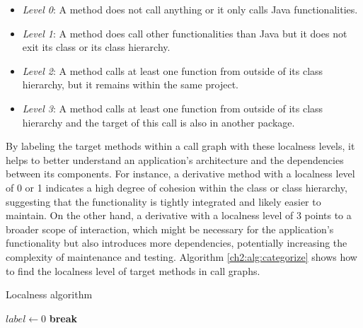 \begin{itemize}
    \item \emph{Level 0}: A method does not call anything or it only calls Java functionalities.
    \item \emph{Level 1}: A method does call other functionalities than Java but it does not exit its class or its class hierarchy.
    \item \emph{Level 2}: A method calls at least one function from outside of its class hierarchy, but it remains within the same project.
    \item \emph{Level 3}: A method calls at least one function from outside of its class hierarchy and the target of this call is also in another package.
\end{itemize}

By labeling the target methods within a call graph with these localness levels, it helps to better understand an application's architecture and the dependencies between its components. For instance, a derivative method with a localness level of 0 or 1 indicates a high degree of cohesion within the class or class hierarchy, suggesting that the functionality is tightly integrated and likely easier to maintain. On the other hand, a derivative with a localness level of 3 points to a broader scope of interaction, which might be necessary for the application's functionality but also introduces more dependencies,
potentially increasing the complexity of maintenance and testing. Algorithm \ref{ch2:alg:categorize} shows how to find the localness level of target methods in call graphs.

\begin{algorithm}
\caption{Localness algorithm}
\label{ch2:alg:categorize}
\begin{algorithmic}[1]
\footnotesize
{}
    \State $label \gets 0$
    \EndIf
            \Else
                \Else
                    \State \textbf{break}
                \EndIf
            \EndIf
        \EndIf
    \EndFor
\EndFunction
\end{algorithmic}
\end{algorithm}


